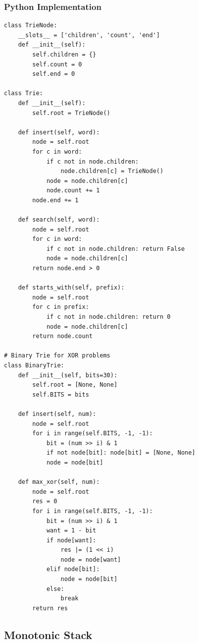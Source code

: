 \documentclass[10pt,a4paper]{article}
\theoremstyle{cpstyle}
\begin{document}
\subsubsection{Python Implementation}
\begin{lstlisting}[caption={Trie -- insert, search, prefix count}]
class TrieNode:
    __slots__ = ['children', 'count', 'end']
    def __init__(self):
        self.children = {}
        self.count = 0
        self.end = 0

class Trie:
    def __init__(self):
        self.root = TrieNode()

    def insert(self, word):
        node = self.root
        for c in word:
            if c not in node.children:
                node.children[c] = TrieNode()
            node = node.children[c]
            node.count += 1
        node.end += 1

    def search(self, word):
        node = self.root
        for c in word:
            if c not in node.children: return False
            node = node.children[c]
        return node.end > 0

    def starts_with(self, prefix):
        node = self.root
        for c in prefix:
            if c not in node.children: return 0
            node = node.children[c]
        return node.count

# Binary Trie for XOR problems
class BinaryTrie:
    def __init__(self, bits=30):
        self.root = [None, None]
        self.BITS = bits

    def insert(self, num):
        node = self.root
        for i in range(self.BITS, -1, -1):
            bit = (num >> i) & 1
            if not node[bit]: node[bit] = [None, None]
            node = node[bit]

    def max_xor(self, num):
        node = self.root
        res = 0
        for i in range(self.BITS, -1, -1):
            bit = (num >> i) & 1
            want = 1 - bit
            if node[want]:
                res |= (1 << i)
                node = node[want]
            elif node[bit]:
                node = node[bit]
            else:
                break
        return res
\end{lstlisting}

\clearpage
\subsection{Monotonic Stack}
\end{document}
